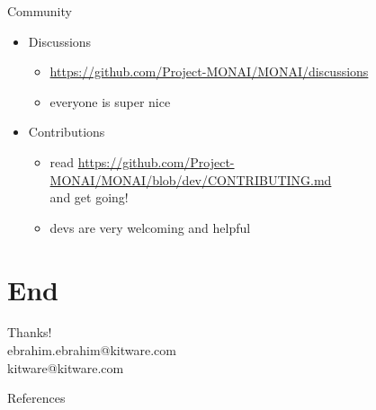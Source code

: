 \documentclass[10pt,aspectratio=169,dvipsnames]{beamer}
\begin{document}
\begin{frame}{Community}
\begin{itemize}
	\item Discussions
	\begin{itemize}
		\item \url{https://github.com/Project-MONAI/MONAI/discussions}
		\item everyone is super nice
	\end{itemize}
	\item Contributions
	\begin{itemize}
		\item read \url{https://github.com/Project-MONAI/MONAI/blob/dev/CONTRIBUTING.md}\\and get going!
		\item devs are very welcoming and helpful
	\end{itemize}
\end{itemize}
\end{frame}


\section{End}



\begin{frame}[standout]
\centering
{\huge Thanks!}\\
ebrahim.ebrahim@kitware.com\\
kitware@kitware.com\\
\vspace{1cm}
\end{frame}


\begin{frame}[allowframebreaks]{References}
\printbibliography
\end{frame}
\end{document}

